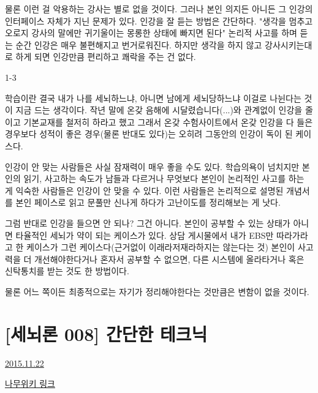 물론 이런 걸 악용하는 강사는 별로 없을 것이다. 그러나 본인 의지든 아니든 그 인강의 인터페이스 자체가 지닌 문제가 있다.
인강을 잘 듣는 방법은 간단하다. "생각을 멈추고 오로지 강사의 말에만 귀기울이는 몽롱한 상태에 빠지면 된다"
논리적 사고를 하며 듣는 순간 인강은 매우 불편해지고 번거로워진다.
하지만 생각을 하지 않고 강사시키는대로 하게 되면 인강만큼 편리하고 쾌락을 주는 건 없다.
\vspace{5mm}

1-3
\vspace{5mm}

학습이란 결국 내가 나를 세뇌하느냐, 아니면 남에게 세뇌당하느냐
이걸로 나뉜다는 것이 지금 드는 생각이다.
작년 말에 온갖 음해에 시달렸습니다(...)와 관계없이 인강을 줄이고 기본교재를 철저히 하라고 했고
그래서 온갖 수험사이트에서 온갖 인강을 다 들은 경우보다 성적이 좋은 경우(물론 반대도 있다)는
오히려 그동안의 인강이 독이 된 케이스다.
\vspace{5mm}

인강이 안 맞는 사람들은 사실 잠재력이 매우 좋을 수도 있다.
학습의욕이 넘치지만 본인의 읽기, 사고하는 속도가 남들과 다르거나
무엇보다 본인이 논리적인 사고를 하는 게 익숙한 사람들은 인강이 안 맞을 수 있다.
이런 사람들은 논리적으로 설명된 개념서를 본인 페이스로 읽고 문풀만 신나게 하다가 고난이도를 정리해보는 게 낫다.
\vspace{5mm}

그럼 반대로 인강을 들으면 안 되나? 그건 아니다.
본인이 공부할 수 있는 상태가 아니면 타율적인 세뇌가 약이 되는 케이스가 있다.
상담 게시물에서 내가 EBS만 따라가라고 한 케이스가 그런 케이스다(근거없이 이래라저재라하지는 않는다는 것)
본인이 사고력을 더 개선해야한다거나 혼자서 공부할 수 없으면, 다른 시스템에 올라타거나 혹은 신탁통치를 받는 것도 한 방법이다.
\vspace{5mm}

물론 어느 쪽이든 최종적으로는 자기가 정리해야한다는 것만큼은 변함이 없을 것이다.
\vspace{5mm}






\section{[세뇌론 008] 간단한 테크닉}
\href{https://www.kockoc.com/Apoc/505389}{2015.11.22}

\vspace{5mm}

\href{https://namu.wiki/w/%EC%84%B8%EB%87%8C}{나무위키 링크}

